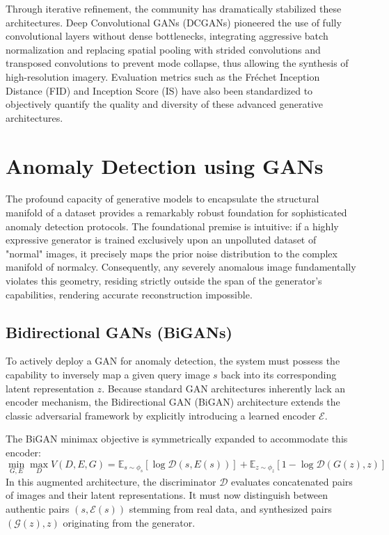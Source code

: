 Through iterative refinement, the community has dramatically stabilized these architectures. Deep Convolutional GANs (DCGANs) pioneered the use of fully convolutional layers without dense bottlenecks, integrating aggressive batch normalization and replacing spatial pooling with strided convolutions and transposed convolutions to prevent mode collapse, thus allowing the synthesis of high-resolution imagery. Evaluation metrics such as the Fréchet Inception Distance (FID) and Inception Score (IS) have also been standardized to objectively quantify the quality and diversity of these advanced generative architectures.

\section{Anomaly Detection using GANs}
The profound capacity of generative models to encapsulate the structural manifold of a dataset provides a remarkably robust foundation for sophisticated anomaly detection protocols. The foundational premise is intuitive: if a highly expressive generator is trained exclusively upon an unpolluted dataset of "normal" images, it precisely maps the prior noise distribution to the complex manifold of normalcy. Consequently, any severely anomalous image fundamentally violates this geometry, residing strictly outside the span of the generator's capabilities, rendering accurate reconstruction impossible.

\subsection{Bidirectional GANs (BiGANs)}
To actively deploy a GAN for anomaly detection, the system must possess the capability to inversely map a given query image $s$ back into its corresponding latent representation $z$. Because standard GAN architectures inherently lack an encoder mechanism, the Bidirectional GAN (BiGAN) architecture extends the classic adversarial framework by explicitly introducing a learned encoder $\mathcal{E}$.

The BiGAN minimax objective is symmetrically expanded to accommodate this encoder:
\begin{equation}
\min_{G, E} \max_{D} V(D, E, G) = \mathbb{E}_{s \sim \phi_s}[\log \mathcal{D}(s, E(s))] + \mathbb{E}_{z \sim \phi_z}[1 - \log \mathcal{D}(G(z), z)]
\end{equation}
In this augmented architecture, the discriminator $\mathcal{D}$ evaluates concatenated pairs of images and their latent representations. It must now distinguish between authentic pairs $(s, \mathcal{E}(s))$ stemming from real data, and synthesized pairs $(\mathcal{G}(z), z)$ originating from the generator.

